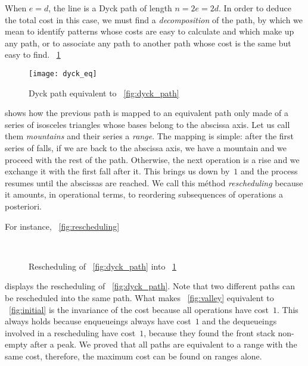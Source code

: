 When \(e=d\), the line is a Dyck path of length \(n=2e=2d\). In order
to deduce the total cost in this case, we must find a
\emph{decomposition} of the path, by
which we mean to identify patterns whose costs are easy to calculate
and which make up any path, or to associate any path to another path
whose cost is the same but easy to find. \Fig~\ref{fig:dyck_eq}
\begin{figure}[!b]
\centering
\texttt{[image: dyck\_eq]}
\caption{Dyck path equivalent to \fig~\ref{fig:dyck_path}
\label{fig:dyck_eq}}
\end{figure}
shows how the previous path is mapped to an equivalent path only made
of a series of isosceles triangles whose bases belong to the abscissa
axis. Let us call them \emph{mountains} and
their series a \emph{range}. The mapping is
simple: after the first series of falls, if we are back to the
abscissa axis, we have a mountain and we proceed with the rest of the
path. Otherwise, the next operation is a rise and we exchange it with
the first fall after it. This brings us down by~\(1\) and the process
resumes until the abscissas are reached. We call this méthod
\emph{rescheduling} because it amounts,
in operational terms, to reordering subsequences of operations a
posteriori.

For instance, \fig~\vref{fig:rescheduling}
\begin{figure}
\centering
{}
\qquad
{}\\
\qquad
{}
\caption{Rescheduling of \fig~\ref{fig:dyck_path} into
  \fig~\ref{fig:dyck_eq}\label{fig:rescheduling}}
\end{figure}
displays the rescheduling of \fig~\vref{fig:dyck_path}. Note that two
different paths can be rescheduled into the same path. What makes
\fig~\ref{fig:valley} equivalent to \fig~\ref{fig:initial} is the
invariance of the cost because all operations have cost~\(1\). This
always holds because enqueueings always have cost~\(1\) and the
dequeueings involved in a rescheduling have cost~\(1\), because they
found the front stack non\hyp{}empty after a peak. We proved that all
paths are equivalent to a range with the same cost, therefore, the
maximum cost can be found on ranges alone.

